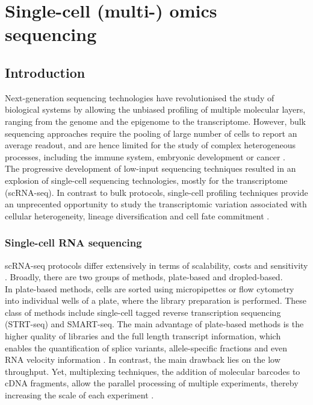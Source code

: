 \graphicspath{{Chapter1/Figs/}}

\chapter{Single-cell (multi-) omics sequencing}

\section{Introduction}
Next-generation sequencing technologies have revolutionised the study of biological systems by allowing the unbiased profiling of multiple molecular layers, ranging from the genome\cite{Fleischmann1995} and the epigenome\cite{Frommer1992} to the transcriptome\cite{Lister2008,Bainbridge2006,Nagalakshmi2008,Mortazavi2008}. However, bulk sequencing approaches require the pooling of large number of cells to report an average readout, and are hence limited for the study of complex heterogeneous processes, including the immune system, embryonic development or cancer \cite{Griffiths2018,Papalexi2017,Patel2014}.\\
The progressive development of low-input sequencing techniques resulted in an explosion of single-cell sequencing technologies, mostly for the transcriptome (scRNA-seq). In contrast to bulk protocols, single-cell profiling techniques provide an unprecented opportunity to study the transcriptomic variation associated with cellular heterogeneity, lineage diversification and cell fate commitment \cite{Kolodziejczyk2015}.

\subsection{Single-cell RNA sequencing} \label{section:rna_expresssion}
scRNA-seq protocols differ extensively in terms of scalability, costs and sensitivity \cite{Svensson2018, Lafzi2018}. Broadly, there are two groups of methods, plate-based and dropled-based.\\
In plate-based methods, cells are sorted using micropipettes or flow cytometry into individual wells of a plate, where the library preparation is performed. These class of methods include single-cell tagged reverse transcription sequencing (STRT-seq\cite{Islam2011}) and SMART-seq\cite{Ramskold2012, Picelli2014}. The main advantage of plate-based methods is the higher quality of libraries and the full length transcript information, which enables the quantification of splice variants\cite{Huang2017}, allele-specific fractions\cite{Deng2014} and even RNA velocity information \cite{LaManno2018}. In contrast, the main drawback lies on the low throughput. Yet, multiplexing techniques, the addition of molecular barcodes to cDNA fragments, allow the parallel processing of multiple experiments, thereby increasing the scale of each experiment \cite{Hashimshony2012}. \\
	
